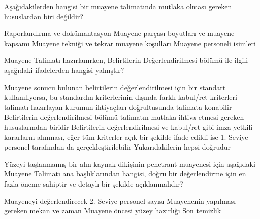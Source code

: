 \begin{question}[subtitle=]
Aşağıdakilerden hangisi bir muayene talimatında mutlaka olması gereken hususlardan biri değildir?
	\begin{tasks}
          \task Raporlandırma ve dokümantasyon
          \task Muayene parçası boyutları ve muayene kapsamı
          \task Muayene tekniği ve tekrar muayene koşulları
          \task Muayene personeli isimleri \correct
	\end{tasks}
\end{question}
\begin{solution}
	\correct
\end{solution}

\begin{question}[subtitle=]
Muayene Talimatı hazırlanırken, Belirtilerin Değerlendirilmesi bölümü ile ilgili aşağıdaki ifadelerden hangisi yalnıştır?
	\begin{tasks}
          \task Muayene sonucu bulunan belirtilerin değerlendirilmesi için bir standart kullanılıyorsa, bu standardın kriterlerinin dışında farklı kabul/ret kriterleri talimatı hazırlayan kurumun ihtiyaçları doğrultusunda talimata konabilir
          \task Belirtilerin değerlendirilmesi bölümü talimatın mutlaka ihtiva etmesi gereken hususlarından biridir
          \task Belirtilerin değerlendirilmesi ve kabul/ret gibi imza yetkili kararların alınması, eğer tüm kriterler açık bir şekilde ifade edildi ise 1. Seviye personel tarafından da gerçekleştirilebilir \correct
          \task Yukarıdakilerin hepsi doğrudur
	\end{tasks}
\end{question}
\begin{solution}
	\correct
\end{solution}

\begin{question}[subtitle=]
Yüzeyi taşlanmamış bir alın kaynak dikişinin penetrant muayenesi için aşağıdaki Muayene Talimatı ana başlıklarından hangisi, doğru bir değerlendirme için en fazla öneme sahiptir ve detaylı bir şekilde açıklanmalıdır?
	\begin{tasks}
          \task Muayeneyi değerlendirecek 2. Seviye personel sayısı
          \task Muayenenin yapılması gereken mekan ve zaman
          \task Muayene öncesi yüzey hazırlığı \correct
          \task Son temizlik
	\end{tasks}
\end{question}
\begin{solution}
	\correct
\end{solution}
